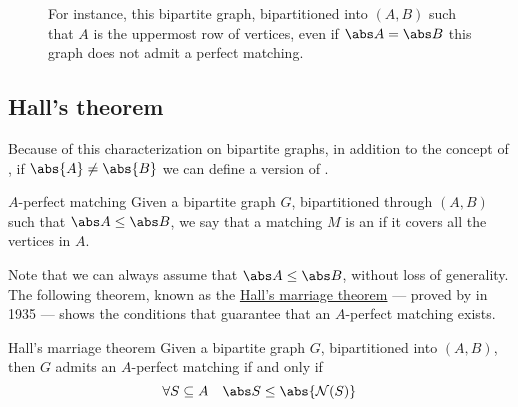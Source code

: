 \documentclass[a4paper, 12pt]{report}
\begin{document}
    \begin{figure}[H]
        \centering
        \caption{For instance, this bipartite graph, bipartitioned into $(A, B)$ such that $A$ is the uppermost row of vertices, even if $\abs A = \abs B$ this graph does not admit a perfect matching.}
    \end{figure}

    \subsection{Hall's theorem}

    Because of this characterization on bipartite graphs, in addition to the concept of , if $\abs {A} \neq \abs{B}$ we can define a  version of .

    \begin{frameddefn}{$A$-perfect matching}
        Given a bipartite graph $G$, bipartitioned through $(A, B)$ such that $\abs A \le \abs B$, we say that a matching $M$ is an  if it covers all the vertices in $A$.
    \end{frameddefn}

    Note that we can always assume that $\abs A \le \abs B$, without loss of generality. The following theorem, known as the \href{https://en.wikipedia.org/wiki/Hall%27s_marriage_theorem}{Hall's marriage theorem} --- proved by \textcite{hall} in 1935 --- shows the conditions that guarantee that an $A$-perfect matching exists.

        \begin{framedthm}[label={hall}]{Hall's marriage theorem}
        Given a bipartite graph $G$, bipartitioned into $(A, B)$, then $G$ admits an $A$-perfect matching if and only if $$\forall S \subseteq A \quad \abs S \le \abs{\mathcal N (S)}$$
    \end{framedthm}
\end{document}
